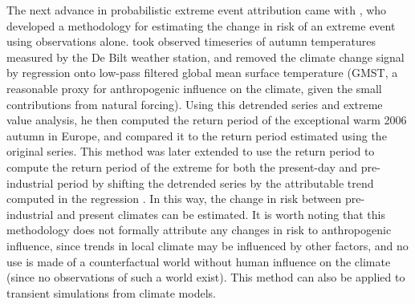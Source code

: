     The next advance in probabilistic extreme event attribution came with \citet{van_oldenborgh_how_2007}, who developed a methodology for estimating the change in risk of an extreme event using observations alone. \citeauthor{van_oldenborgh_how_2007} took observed timeseries of autumn temperatures measured by the De Bilt weather station, and removed the climate change signal by regression onto low-pass filtered global mean surface temperature (GMST, a reasonable proxy for anthropogenic influence on the climate, given the small contributions from natural forcing). Using this detrended series and extreme value analysis, he then computed the return period of the exceptional warm 2006 autumn in Europe, and compared it to the return period estimated using the original series. This method was later extended to use the return period to compute the return period of the extreme for both the present-day and pre-industrial period by shifting the detrended series by the attributable trend computed in the regression \citep[eg.][]{philip_protocol_2020,leach_anthropogenic_2020}. In this way, the change in risk between pre-industrial and present climates can be estimated. It is worth noting that this methodology does not formally attribute any changes in risk to anthropogenic influence, since trends in local climate may be influenced by other factors, and no use is made of a counterfactual world without human influence on the climate (since no observations of such a world exist). This method can also be applied to transient simulations from climate models.

